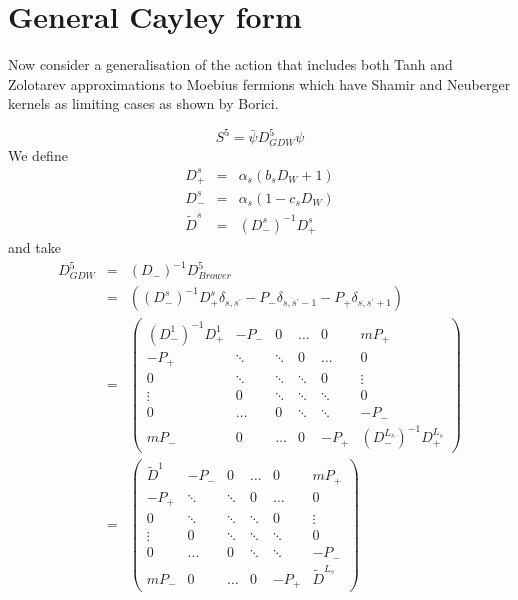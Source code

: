 \documentclass[letter,10pt]{report}
\begin{document}
\chapter{General Cayley form}

Now consider a generalisation of the action that includes
both Tanh and Zolotarev approximations to  Moebius fermions
\cite{Brower:2004xi,Brower:2005qw}
which have Shamir and Neuberger kernels as limiting cases as
shown by Borici\cite{Borici:1999zw,Borici:1999da}.

\begin{equation}
S^5 = \bar{\psi} D^5_{GDW} \psi
\end{equation}
We define
\begin{eqnarray}
D^s_+ &=& \alpha_s (b_s  D_W + 1)\\
D^s_- &=& \alpha_s (1-c_s  D_W )\\
\tilde{D}^s &=& (D^s_-)^{-1} D^s_+
\end{eqnarray}
and take
\begin{eqnarray}
D^5_{GDW}
 &= &  (D_-)^{-1} D^5_{Brower}\\
 &= & 
 \left( 
         (D_-^{s})^{-1} D^{s}_+ \delta_{s,s^\prime}
 -  P_- \delta_{s,s^\prime-1}
 -  P_+ \delta_{s,s^\prime+1} 
\right) \\
&=&
\left(
\begin{array}{cccccc}
  (D^1_- )^{-1}D^1_+ & - P_- & 0& \ldots & 0 &  m P_+ \\
-  P_+  & \ddots &  \ddots & 0      & \ldots &0 \\
0     & \ddots &  \ddots & \ddots & 0      &\vdots \\
\vdots& 0      &  \ddots & \ddots & \ddots & 0\\
0     & \ldots &    0    &  \ddots& \ddots & - P_- \\
m P_- & 0      & \ldots  &  0     &   - P_+   
& (D^{L_s}_- )^{-1}D^{L_s}_+
\end{array}
\right)\\
&=&
\left(
\begin{array}{cccccc}
  \tilde{D}^{1} & - P_- & 0& \ldots & 0 &  m P_+ \\
-  P_+  & \ddots &  \ddots & 0      & \ldots &0 \\
0     & \ddots &  \ddots & \ddots & 0      &\vdots \\
\vdots& 0      &  \ddots & \ddots & \ddots & 0\\
0     & \ldots &    0    &  \ddots& \ddots & - P_- \\
m P_- & 0      & \ldots  &  0     &   - P_+   
& \tilde{D}^{L_s}
\end{array}
\right)
\end{eqnarray}
\end{document}
